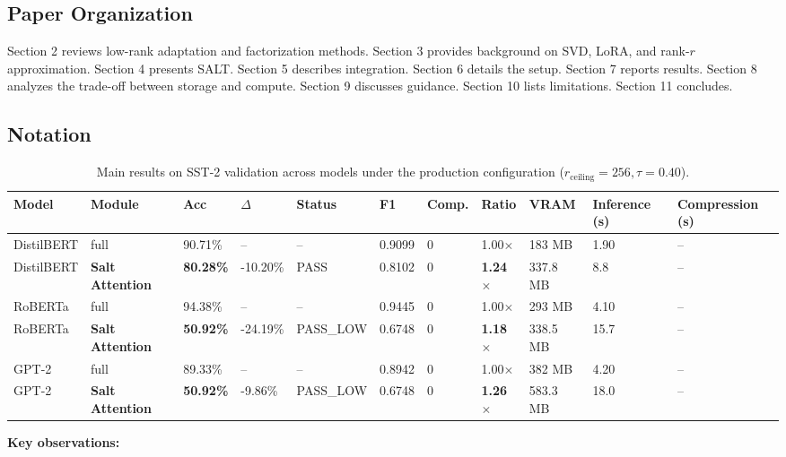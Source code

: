 \subsection{Paper Organization}

Section 2 reviews low-rank adaptation and factorization methods. Section 3 
provides background on SVD, LoRA, and rank-$r$ approximation. Section 4 
presents SALT. Section 5 describes integration. Section 6 details the setup. 
Section 7 reports results. Section 8 analyzes the trade-off between storage 
and compute. Section 9 discusses guidance. Section 10 lists limitations. 
Section 11 concludes.



\subsection{Notation}

\begin{table}[t]
\centering
\small
\begin{tabular}{lllllllllll}
\toprule
\textbf{Model} & \textbf{Module} & \textbf{Acc} & \textbf{$\Delta$} & \textbf{Status} & \textbf{F1} & \textbf{Comp.} & \textbf{Ratio} & \textbf{VRAM} & \textbf{Inference (s)} & \textbf{Compression (s)} \\
\midrule
DistilBERT & full & 90.71\% & -- & -- & 0.9099 & 0 & 1.00$\times$ & 183 MB & 1.90 & -- \\
DistilBERT & \textbf{Salt Attention} & \textbf{80.28\%} & -10.20\% & PASS & 0.8102 & 0 & \textbf{1.24$\times$} & 337.8 MB & 8.8 & -- \\
RoBERTa & full & 94.38\% & -- & -- & 0.9445 & 0 & 1.00$\times$ & 293 MB & 4.10 & -- \\
RoBERTa & \textbf{Salt Attention} & \textbf{50.92\%} & -24.19\% & PASS_LOW & 0.6748 & 0 & \textbf{1.18$\times$} & 338.5 MB & 15.7 & -- \\
GPT-2 & full & 89.33\% & -- & -- & 0.8942 & 0 & 1.00$\times$ & 382 MB & 4.20 & -- \\
GPT-2 & \textbf{Salt Attention} & \textbf{50.92\%} & -9.86\% & PASS_LOW & 0.6748 & 0 & \textbf{1.26$\times$} & 583.3 MB & 18.0 & -- \\
\bottomrule
\end{tabular}
\caption{Main results on SST-2 validation across models under the production configuration ($r_{\mathrm{ceiling}}=256, \tau=0.40$).}
\label{tab:main_sst2}
\end{table}

\textbf{Key observations:}

